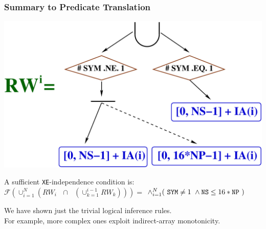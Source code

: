 \documentclass{beamer}
\renewcommand{\emph}[1]{\textcolor{structure}{#1}}
\begin{document}

\begin{frame}[fragile,t]
  \frametitle{Summary to Predicate Translation}

\begin{center} \hspace{-9ex}
\includegraphics[height=17ex]{Figures/RW_IND_XE}
\end{center}

A sufficient {\tt XE}-independence condition is: \bigskip \\ 
$\mathcal{F}(\cup_{i=1}^{N}(RW_i \mbox{ }\cap\mbox{ } (\cup_{k=1}^{i-1}RW_k))) =$ 
\emph{$\wedge_{i=1}^N(\mbox{ }{\tt SYM}\neq 1\mbox{ }\wedge {\tt NS}\leq 16*{\tt NP}\mbox{ })$} 

\bigskip
\bigskip

We have shown just the trivial logical inference rules.\\
For example, more complex ones exploit indirect-array monotonicity. 



\end{frame}
\end{document}
